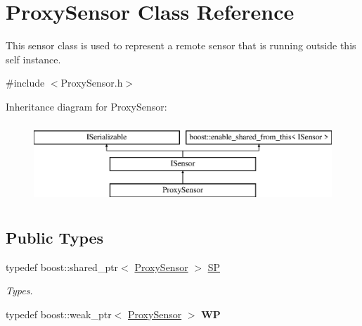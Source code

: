 \hypertarget{class_proxy_sensor}{}\section{Proxy\+Sensor Class Reference}
\label{class_proxy_sensor}


This sensor class is used to represent a remote sensor that is running outside this self instance.  




{\ttfamily \#include $<$Proxy\+Sensor.\+h$>$}

Inheritance diagram for Proxy\+Sensor\+:\begin{figure}[H]
\begin{center}
\leavevmode
\includegraphics[height=3.000000cm]{class_proxy_sensor}
\end{center}
\end{figure}
\subsection*{Public Types}
\begin{DoxyCompactItemize}
\item 
\mbox{\label{class_proxy_sensor_ae00680b19ebf3399157515c5895e768c}} 
typedef boost\+::shared\+\_\+ptr$<$ \hyperlink{class_proxy_sensor}{Proxy\+Sensor} $>$ \hyperlink{class_proxy_sensor_ae00680b19ebf3399157515c5895e768c}{SP}
\begin{DoxyCompactList}\small\item\em Types. \end{DoxyCompactList}\item 
\mbox{\label{class_proxy_sensor_a2b49ec093d942b5e828bdec66d958738}} 
typedef boost\+::weak\+\_\+ptr$<$ \hyperlink{class_proxy_sensor}{Proxy\+Sensor} $>$ {\bfseries WP}
\end{DoxyCompactItemize}

